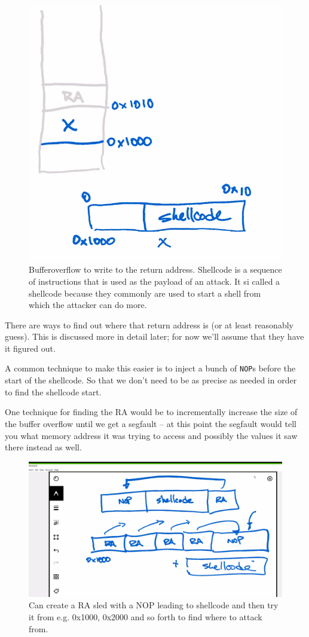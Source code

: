 \documentclass[../notes.tex]{subfiles}
\begin{document}
\begin{figure}[H]
    \centering
    \includegraphics[width=0.8\linewidth]{img/image_2023-01-16-18-27-59.png}
    \caption{Bufferoverflow to write to the return address. Shellcode is a sequence of instructions that is used as the payload of an attack. It si called a shellcode because they commonly are used to start a shell from which the attacker can do more.}
\end{figure}


There are ways to find out where that return address is (or at least reasonably guess).
This is discussed more in detail later; for now we'll assume that they have it figured out.


A common technique to make this easier is to inject a bunch of \texttt{NOP}s before the start of the shellcode. So that we don't need to be as precise as needed in order to find the shellcode start.

One technique for finding the RA would be to incrementally increase the size of the buffer overflow until we get a segfault -- at this point the segfault would tell you what memory address it was trying to access and possibly the values it saw there instead as well.

\begin{figure}[H]
    \centering
    \includegraphics[width=0.8\linewidth]{img/image_2023-01-16-18-37-29.png}
    \caption{Can create a RA sled with a NOP leading to shellcode and then try it from e.g. 0x1000, 0x2000 and so forth to find where to attack from.}



\end{figure}
\end{document}
